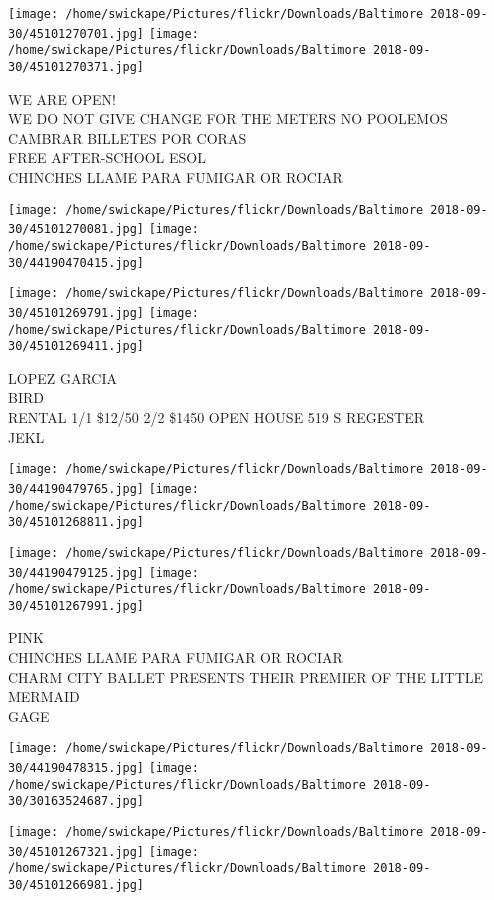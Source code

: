 \documentclass[10pt,letterpaper]{article}
\begin{document}
\texttt{[image: /home/swickape/Pictures/flickr/Downloads/Baltimore 2018-09-30/45101270701.jpg]}
\texttt{[image: /home/swickape/Pictures/flickr/Downloads/Baltimore 2018-09-30/45101270371.jpg]}

WE ARE OPEN!\\
WE DO NOT GIVE CHANGE FOR THE METERS NO POOLEMOS CAMBRAR BILLETES POR CORAS\\
FREE AFTER{-}SCHOOL ESOL\\
CHINCHES LLAME PARA FUMIGAR OR ROCIAR
\pagebreak

\texttt{[image: /home/swickape/Pictures/flickr/Downloads/Baltimore 2018-09-30/45101270081.jpg]}
\texttt{[image: /home/swickape/Pictures/flickr/Downloads/Baltimore 2018-09-30/44190470415.jpg]}

\texttt{[image: /home/swickape/Pictures/flickr/Downloads/Baltimore 2018-09-30/45101269791.jpg]}
\texttt{[image: /home/swickape/Pictures/flickr/Downloads/Baltimore 2018-09-30/45101269411.jpg]}

LOPEZ GARCIA\\
BIRD\\
RENTAL 1/1 \$12/50 2/2 \$1450 OPEN HOUSE 519 S REGESTER\\
JEKL
\pagebreak

\texttt{[image: /home/swickape/Pictures/flickr/Downloads/Baltimore 2018-09-30/44190479765.jpg]}
\texttt{[image: /home/swickape/Pictures/flickr/Downloads/Baltimore 2018-09-30/45101268811.jpg]}

\texttt{[image: /home/swickape/Pictures/flickr/Downloads/Baltimore 2018-09-30/44190479125.jpg]}
\texttt{[image: /home/swickape/Pictures/flickr/Downloads/Baltimore 2018-09-30/45101267991.jpg]}

PINK\\
CHINCHES LLAME PARA FUMIGAR OR ROCIAR\\
CHARM CITY BALLET PRESENTS THEIR PREMIER OF THE LITTLE MERMAID\\
GAGE
\pagebreak

\texttt{[image: /home/swickape/Pictures/flickr/Downloads/Baltimore 2018-09-30/44190478315.jpg]}
\texttt{[image: /home/swickape/Pictures/flickr/Downloads/Baltimore 2018-09-30/30163524687.jpg]}

\texttt{[image: /home/swickape/Pictures/flickr/Downloads/Baltimore 2018-09-30/45101267321.jpg]}
\texttt{[image: /home/swickape/Pictures/flickr/Downloads/Baltimore 2018-09-30/45101266981.jpg]}
\end{document}
